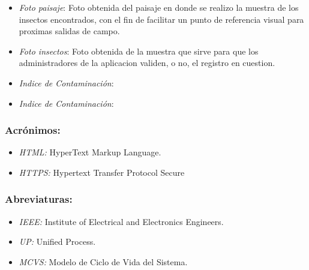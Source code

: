 \begin{itemize}
        

        \item \emph{Foto paisaje}: Foto obtenida del paisaje en donde se realizo la muestra de los insectos encontrados, con el fin de facilitar un punto de referencia visual para proximas salidas de campo.
        
        \item \emph{Foto insectos}: Foto obtenida de la muestra que sirve para que los administradores de la aplicacion validen, o no, el registro en cuestion.




        \item \emph{Indice de Contaminación}:

        \item \emph{Indice de Contaminación}:


        \end{itemize}

        \subsubsection{Acrónimos:}

        \begin{itemize}

        \item \emph{HTML:} HyperText Markup Language.
        
        \item \emph{HTTPS:} Hypertext Transfer Protocol Secure

        \end{itemize}
 
        \subsubsection{Abreviaturas:}

        \begin{itemize}

        \item \emph{IEEE:} Institute of Electrical and Electronics Engineers.
 
        \item \emph{UP:} Unified Process.

        \item \emph{MCVS:} Modelo de Ciclo de Vida del Sistema.

         \end{itemize}
    

